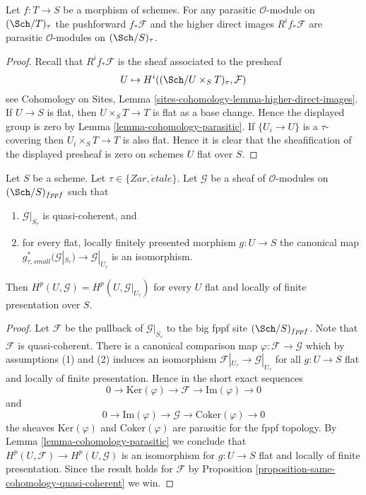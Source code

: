 \begin{lemma}
\label{lemma-direct-image-parasitic}
Let $f : T \to S$ be a morphism of schemes. For any parasitic
$\mathcal{O}$-module on $(\Sch/T)_\tau$ the pushforward
$f_*\mathcal{F}$ and the higher direct images $R^if_*\mathcal{F}$
are parasitic $\mathcal{O}$-modules on $(\Sch/S)_\tau$.
\end{lemma}

\begin{proof}
Recall that $R^if_*\mathcal{F}$ is the sheaf associated to the
presheaf
$$
U \mapsto H^i((\Sch/U \times_S T)_\tau, \mathcal{F})
$$
see
Cohomology on Sites, Lemma \ref{sites-cohomology-lemma-higher-direct-images}.
If $U \to S$ is flat, then $U \times_S T \to T$ is flat as a base change.
Hence the displayed group is zero by
Lemma \ref{lemma-cohomology-parasitic}.
If $\{U_i \to U\}$ is a $\tau$-covering then
$U_i \times_S T \to T$ is also flat.
Hence it is clear that the sheafification of the displayed
presheaf is zero on schemes $U$ flat over $S$.
\end{proof}

\begin{lemma}
\label{lemma-quasi-coherent-and-flat-base-change}
Let $S$ be a scheme. Let $\tau \in \{Zar, \acute{e}tale\}$.
Let $\mathcal{G}$ be a sheaf of $\mathcal{O}$-modules on
$(\Sch/S)_{fppf}$ such that
\begin{enumerate}
\item $\mathcal{G}|_{S_\tau}$ is quasi-coherent, and
\item for every flat, locally finitely presented morphism
$g : U \to S$ the canonical map
$g_{\tau, small}^*(\mathcal{G}|_{S_\tau}) \to \mathcal{G}|_{U_\tau}$
is an isomorphism.
\end{enumerate}
Then $H^p(U, \mathcal{G}) = H^p(U, \mathcal{G}|_{U_\tau})$
for every $U$ flat and locally of finite presentation over $S$.
\end{lemma}

\begin{proof}
Let $\mathcal{F}$ be the pullback of $\mathcal{G}|_{S_\tau}$
to the big fppf site $(\Sch/S)_{fppf}$. Note that $\mathcal{F}$
is quasi-coherent. There is a canonical
comparison map $\varphi : \mathcal{F} \to \mathcal{G}$ which by
assumptions (1) and (2) induces an isomorphism
$\mathcal{F}|_{U_\tau} \to \mathcal{G}|_{U_\tau}$
for all $g : U \to S$ flat and locally of finite presentation.
Hence in the short exact sequences
$$
0 \to \text{Ker}(\varphi) \to \mathcal{F} \to \text{Im}(\varphi) \to 0
$$
and
$$
0 \to \text{Im}(\varphi) \to \mathcal{G} \to \text{Coker}(\varphi) \to 0
$$
the sheaves $\text{Ker}(\varphi)$ and $\text{Coker}(\varphi)$ are
parasitic for the fppf topology. By
Lemma \ref{lemma-cohomology-parasitic}
we conclude that $H^p(U, \mathcal{F}) \to H^p(U, \mathcal{G})$
is an isomorphism for $g : U \to S$ flat and locally of finite presentation.
Since the result holds for $\mathcal{F}$ by
Proposition \ref{proposition-same-cohomology-quasi-coherent}
we win.
\end{proof}









